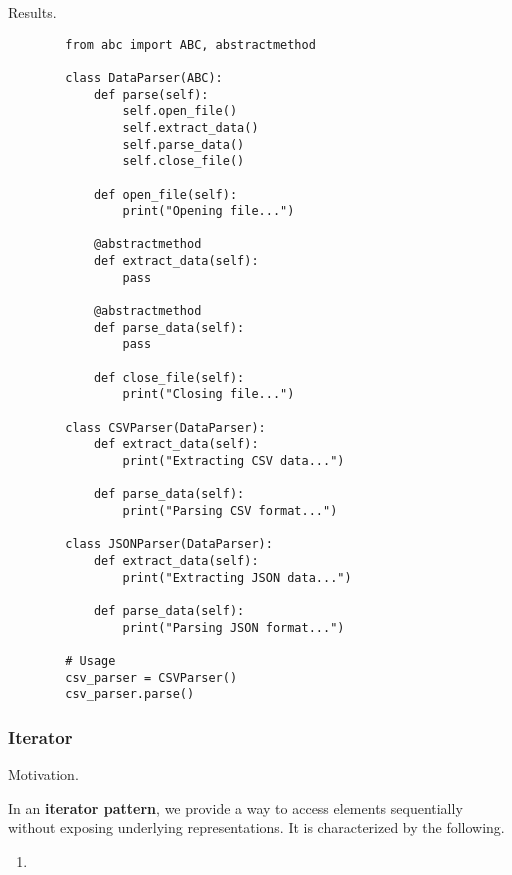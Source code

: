     Results. 

    \begin{example}
      \begin{lstlisting}
        from abc import ABC, abstractmethod

        class DataParser(ABC):
            def parse(self):
                self.open_file()
                self.extract_data()
                self.parse_data()
                self.close_file()
            
            def open_file(self):
                print("Opening file...")
            
            @abstractmethod
            def extract_data(self):
                pass
            
            @abstractmethod
            def parse_data(self):
                pass
            
            def close_file(self):
                print("Closing file...")

        class CSVParser(DataParser):
            def extract_data(self):
                print("Extracting CSV data...")
            
            def parse_data(self):
                print("Parsing CSV format...")

        class JSONParser(DataParser):
            def extract_data(self):
                print("Extracting JSON data...")
            
            def parse_data(self):
                print("Parsing JSON format...")

        # Usage
        csv_parser = CSVParser()
        csv_parser.parse() 
      \end{lstlisting}
    \end{example}

  \subsubsection{Iterator}

    Motivation. 

    \begin{definition}
      In an \textbf{iterator pattern}, we provide a way to access elements sequentially without exposing underlying representations. It is characterized by the following. 
      \begin{enumerate}
        \item 
      \end{enumerate}
    \end{definition}

